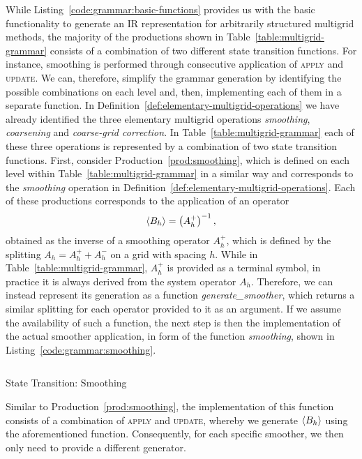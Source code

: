 While Listing~\ref{code:grammar:basic-functions} provides us with the basic functionality to generate an IR representation for arbitrarily structured multigrid methods, the majority of the productions shown in Table~\ref{table:multigrid-grammar} consists of a combination of two different state transition functions.
For instance, smoothing is performed through consecutive application of \textsc{apply} and \textsc{update}.
We can, therefore, simplify the grammar generation by identifying the possible combinations on each level and, then, implementing each of them in a separate function.
In Definition~\ref{def:elementary-multigrid-operations} we have already identified the three elementary multigrid operations \emph{smoothing}, \emph{coarsening} and \emph{coarse-grid correction}.
In Table~\ref{table:multigrid-grammar} each of these three operations is represented by a combination of two state transition functions.
First, consider Production~\ref{prod:smoothing}, which is defined on each level within Table~\ref{table:multigrid-grammar} in a similar way and corresponds to the \emph{smoothing} operation in Definition~\ref{def:elementary-multigrid-operations}.
Each of these productions corresponds to the application of an operator
\begin{equation*}
	\langle B_{h} \rangle = \left( A^+_{h} \right)^{-1},
\end{equation*}
obtained as the inverse of a smoothing operator $A^+_{h}$, which is defined by the splitting $A_{h} = A^+_{h} + A^-_{h}$ on a grid with spacing $h$.
While in Table~\ref{table:multigrid-grammar}, $A^+_{h}$ is provided as a terminal symbol, in practice it is always derived from the system operator $A_{h}$.
Therefore, we can instead represent its generation as a function \emph{generate\_smoother}, which returns a similar splitting for each operator provided to it as an argument.
If we assume the availability of such a function, the next step is then the implementation of the actual smoother application, in form of the function \emph{smoothing}, shown in Listing~\ref{code:grammar:smoothing}.
\begin{listing}
	\inputminted{python}{evostencils/grammar/smoothing.py}
	\caption{State Transition: Smoothing}
	\label{code:grammar:smoothing}
\end{listing}
Similar to Production~\ref{prod:smoothing}, the implementation of this function consists of a combination of \textsc{apply} and \textsc{update}, whereby we generate $\langle B_{h} \rangle$ using the aforementioned function.
Consequently, for each specific smoother, we then only need to provide a different generator.
